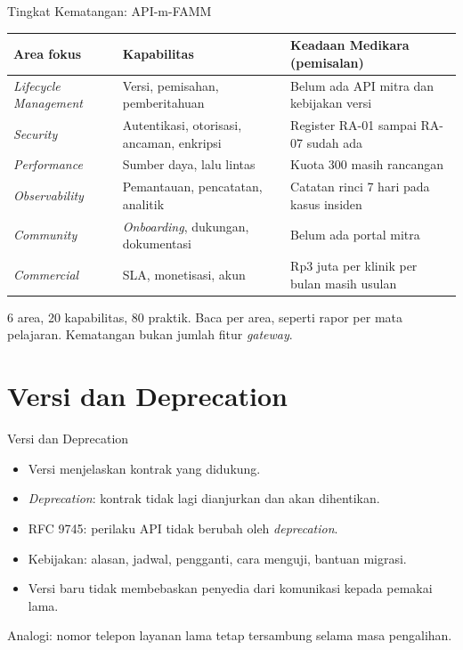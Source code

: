 \documentclass[aspectratio=169, table, 12pt]{beamer}
\begin{document}
\begin{frame}{{\Large Tingkat Kematangan: API-m-FAMM}}
  \scriptsize
  \begin{tabularx}{\textwidth}{>{\raggedright\arraybackslash}p{2.9cm} >{\raggedright\arraybackslash}X >{\raggedright\arraybackslash}p{5.1cm}}
    \hline
    \textbf{Area fokus} & \textbf{Kapabilitas} & \textbf{Keadaan Medikara (pemisalan)} \\ \hline
    \textit{Lifecycle Management} & Versi, pemisahan, pemberitahuan & Belum ada API mitra dan kebijakan versi \\ \hline
    \textit{Security} & Autentikasi, otorisasi, ancaman, enkripsi & Register RA-01 sampai RA-07 sudah ada \\ \hline
    \textit{Performance} & Sumber daya, lalu lintas & Kuota 300 masih rancangan \\ \hline
    \textit{Observability} & Pemantauan, pencatatan, analitik & Catatan rinci 7 hari pada kasus insiden \\ \hline
    \textit{Community} & \textit{Onboarding}, dukungan, dokumentasi & Belum ada portal mitra \\ \hline
    \textit{Commercial} & SLA, monetisasi, akun & Rp3 juta per klinik per bulan masih usulan \\ \hline
  \end{tabularx}

  \vspace{6pt}
  \small 6 area, 20 kapabilitas, 80 praktik. Baca per area, seperti rapor per mata pelajaran. Kematangan bukan jumlah fitur \textit{gateway}.
\end{frame}

\section{Versi dan Deprecation}

\begin{frame}{{\Large Versi dan Deprecation}}
  \vspace{8pt}
  \begin{itemize}
    \item Versi menjelaskan kontrak yang didukung.
    \item \textit{Deprecation}: kontrak tidak lagi dianjurkan dan akan dihentikan.
    \item RFC 9745: perilaku API tidak berubah oleh \textit{deprecation}.
    \item Kebijakan: alasan, jadwal, pengganti, cara menguji, bantuan migrasi.
    \item Versi baru tidak membebaskan penyedia dari komunikasi kepada pemakai lama.
  \end{itemize}
  \vspace{6pt}
  {\small Analogi: nomor telepon layanan lama tetap tersambung selama masa pengalihan.}
\end{frame}
\end{document}

